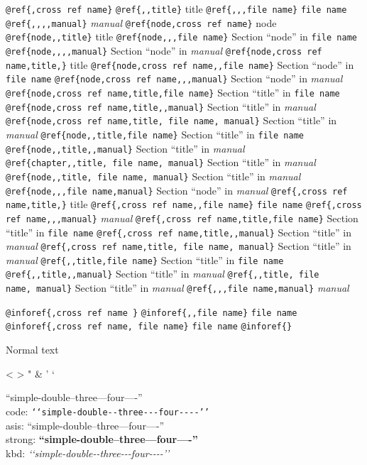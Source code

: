 \documentclass{book}
\begin{document}
\texttt{@ref\{,cross ref name\}} 
\texttt{@ref\{{,}{,}title\}} title
\texttt{@ref\{{,}{,},file name\}} \texttt{file name}
\texttt{@ref\{{,}{,}{,}{,}manual\}} \textsl{manual}
\texttt{@ref\{node,cross ref name\}} node
\texttt{@ref\{node{,}{,}title\}} title
\texttt{@ref\{node{,}{,},file name\}} Section ``node'' in \texttt{file name}
\texttt{@ref\{node{,}{,}{,}{,}manual\}} Section ``node'' in \textsl{manual}
\texttt{@ref\{node,cross ref name,title,\}} title
\texttt{@ref\{node,cross ref name{,}{,}file name\}} Section ``node'' in \texttt{file name}
\texttt{@ref\{node,cross ref name{,}{,},manual\}} Section ``node'' in \textsl{manual}
\texttt{@ref\{node,cross ref name,title,file name\}} Section ``title'' in \texttt{file name}
\texttt{@ref\{node,cross ref name,title{,}{,}manual\}} Section ``title'' in \textsl{manual}
\texttt{@ref\{node,cross ref name,title,\ file name,\ manual\}} Section ``title'' in \textsl{manual}
\texttt{@ref\{node{,}{,}title,file name\}} Section ``title'' in \texttt{file name}
\texttt{@ref\{node{,}{,}title{,}{,}manual\}} Section ``title'' in \textsl{manual}
\texttt{@ref\{chapter{,}{,}title,\ file name,\ manual\}} Section ``title'' in \textsl{manual}
\texttt{@ref\{node{,}{,}title,\ file name,\ manual\}} Section ``title'' in \textsl{manual}
\texttt{@ref\{node{,}{,},file name,manual\}} Section ``node'' in \textsl{manual}
\texttt{@ref\{,cross ref name,title,\}} title
\texttt{@ref\{,cross ref name{,}{,}file name\}} \texttt{file name}
\texttt{@ref\{,cross ref name{,}{,},manual\}} \textsl{manual}
\texttt{@ref\{,cross ref name,title,file name\}} Section ``title'' in \texttt{file name}
\texttt{@ref\{,cross ref name,title{,}{,}manual\}} Section ``title'' in \textsl{manual}
\texttt{@ref\{,cross ref name,title,\ file name,\ manual\}} Section ``title'' in \textsl{manual}
\texttt{@ref\{{,}{,}title,file name\}} Section ``title'' in \texttt{file name}
\texttt{@ref\{{,}{,}title{,}{,}manual\}} Section ``title'' in \textsl{manual}
\texttt{@ref\{{,}{,}title,\ file name,\ manual\}} Section ``title'' in \textsl{manual}
\texttt{@ref\{{,}{,},file name,manual\}} \textsl{manual}

\texttt{@inforef\{,cross ref name \}} 
\texttt{@inforef\{{,}{,}file name\}} \texttt{file name}
\texttt{@inforef\{,cross ref name,\ file name\}} \texttt{file name}
\texttt{@inforef\{\}} 



Normal text

<
>
"
\&
'
`

``simple-double--three---four----''\leavevmode{}\\
code: \texttt{{`}{`}simple-double{-}{-}three{-}{-}{-}four{-}{-}{-}-{'}{'}} \leavevmode{}\\
asis: ``simple-double--three---four----'' \leavevmode{}\\
strong: \textbf{``simple-double--three---four----''} \leavevmode{}\\
kbd: {\ttfamily\textsl{{`}{`}simple-double{-}{-}three{-}{-}{-}four{-}{-}{-}-{'}{'}}} \leavevmode{}\\
\end{document}
